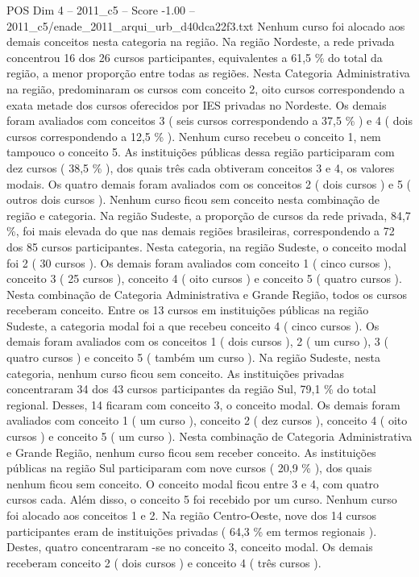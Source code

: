 \begin{textsample}{POS Dim 4 – 2011\_c5 – Score -1.00 – 2011\_c5/enade\_2011\_arqui\_urb\_d40dca22f3.txt}
Nenhum curso foi alocado aos demais conceitos nesta categoria na região.
Na região Nordeste, a rede privada concentrou 16 dos 26 cursos participantes, equivalentes a 61,5 \% do total da região, a menor proporção entre todas as regiões.
Nesta Categoria Administrativa na região, predominaram os cursos com conceito 2, oito cursos correspondendo a exata metade dos cursos oferecidos por IES privadas no Nordeste.
Os demais foram avaliados com conceitos 3 ( seis cursos correspondendo a 37,5 \% ) e 4 ( dois cursos correspondendo a 12,5 \% ).
Nenhum curso recebeu o conceito 1, nem tampouco o conceito 5.
As instituições públicas dessa região participaram com dez cursos ( 38,5 \% ), dos quais três cada obtiveram conceitos 3 e 4, os valores modais.
Os quatro demais foram avaliados com os conceitos 2 ( dois cursos ) e 5 ( outros dois cursos ).
Nenhum curso ficou sem conceito nesta combinação de região e categoria.
Na região Sudeste, a proporção de cursos da rede privada, 84,7 \%, foi mais elevada do que nas demais regiões brasileiras, correspondendo a 72 dos 85 cursos participantes.
Nesta categoria, na região Sudeste, o conceito modal foi 2 ( 30 cursos ).
Os demais foram avaliados com conceito 1 ( cinco cursos ), conceito 3 ( 25 cursos ), conceito 4 ( oito cursos ) e conceito 5 ( quatro cursos ).
Nesta combinação de Categoria Administrativa e Grande Região, todos os cursos receberam conceito.
Entre os 13 cursos em instituições públicas na região Sudeste, a categoria modal foi a que recebeu conceito 4 ( cinco cursos ).
Os demais foram avaliados com os conceitos 1 ( dois cursos ), 2 ( um curso ), 3 ( quatro cursos ) e conceito 5 ( também um curso ).
Na região Sudeste, nesta categoria, nenhum curso ficou sem conceito.
As instituições privadas concentraram 34 dos 43 cursos participantes da região Sul, 79,1 \% do total regional.
Desses, 14 ficaram com conceito 3, o conceito modal.
Os demais foram avaliados com conceito 1 ( um curso ), conceito 2 ( dez cursos ), conceito 4 ( oito cursos ) e conceito 5 ( um curso ).
Nesta combinação de Categoria Administrativa e Grande Região, nenhum curso ficou sem receber conceito.
As instituições públicas na região Sul participaram com nove cursos ( 20,9 \% ), dos quais nenhum ficou sem conceito.
O conceito modal ficou entre 3 e 4, com quatro cursos cada.
Além disso, o conceito 5 foi recebido por um curso.
Nenhum curso foi alocado aos conceitos 1 e 2.
Na região Centro-Oeste, nove dos 14 cursos participantes eram de instituições privadas ( 64,3 \% em termos regionais ).
Destes, quatro concentraram -se no conceito 3, conceito modal.
Os demais receberam conceito 2 ( dois cursos ) e conceito 4 ( três cursos ).

\end{textsample}
